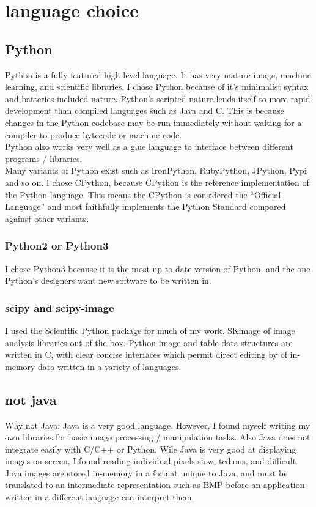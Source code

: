 \chapter{language choice}

\section{Python}
Python is a fully-featured high-level language. It has very mature image, machine learning, and scientific libraries.  I chose Python because of it's minimalist syntax and batteries-included nature.  Python's scripted nature lends itself to more rapid development than compiled languages such as Java and C. This is because changes in the Python codebase may be run immediately without waiting for a compiler to produce bytecode or machine code.\\
Python also works very well as a glue language to interface between different programs / libraries.\\
Many variants of Python exist such as IronPython, RubyPython, JPython, Pypi and so on. I chose CPython, because CPython is the reference implementation of the Python language.  This means the CPython is considered the ``Official Language'' and most faithfully implements the Python Standard compared against other variants.
\subsection{Python2 or Python3}
I chose Python3 because it is the most up-to-date version of Python, and the one Python's designers want new software to be written in.

\subsection{scipy and scipy-image}
I used the Scientific Python package for much of my work. SKimage of image analysis libraries out-of-the-box.  Python image and table data structures are written in C, with clear concise interfaces which permit direct editing by of in-memory data written in a variety of languages.

\section{not java}
Why not Java:  Java is a very good language. However, I found myself writing my own libraries for basic image processing / manipulation tasks.  Also Java does not integrate easily with C/C++ or Python.  Wile Java is very good at displaying images on screen, I found reading individual pixels slow, tedious, and difficult.  Java images are stored in-memory in a format unique to Java, and must be translated to an intermediate representation such as BMP before an application written in a different language can interpret them.

